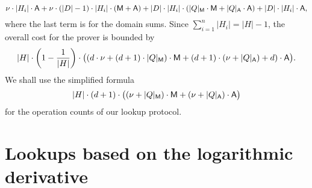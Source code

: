\documentclass[11pt]{article}
\theoremstyle{definition}
\theoremstyle{definition}
\begin{document}
\begin{equation*}
\nu\cdot |H_i|\cdot \textsf A + \nu \cdot (|D| - 1)\cdot |H_{i}| \cdot (\textsf M + \textsf A)
+  |D|\cdot |H_{i}| \cdot ( |Q|_\textsf M \cdot \textsf{M} +  |Q|_\textsf A \cdot \textsf A) 
\\
+ |D|\cdot |H_{i}| \cdot \textsf A,
\end{equation*}
where the last term is for the domain sums.
Since $\sum_{i=1}^{n} |H_{i}| = |H| - 1$, the overall cost for the prover is bounded by 
\begin{equation}
\label{e:sumcheck:cost:precise}
|H|\cdot \left(1-\frac{1}{|H|}\right)\cdot \big( (d\cdot \nu + (d+1)\cdot |Q|_\textsf M)\cdot\textsf M +
(d+1)\cdot (\nu + |Q|_\textsf A) + d)\cdot\textsf A
\big).
\end{equation}
We shall use the simplified formula
\begin{equation}
\label{e:sumcheck:cost}
|H|\cdot (d+1)\cdot\big( (\nu +  |Q|_\textsf M)\cdot\textsf M +
 (\nu + |Q|_\textsf A)\cdot\textsf A
\big)
\end{equation} 
for the operation counts of our lookup protocol.




\section{Lookups based on the logarithmic derivative}
\label{s:lookups}
\end{document}
